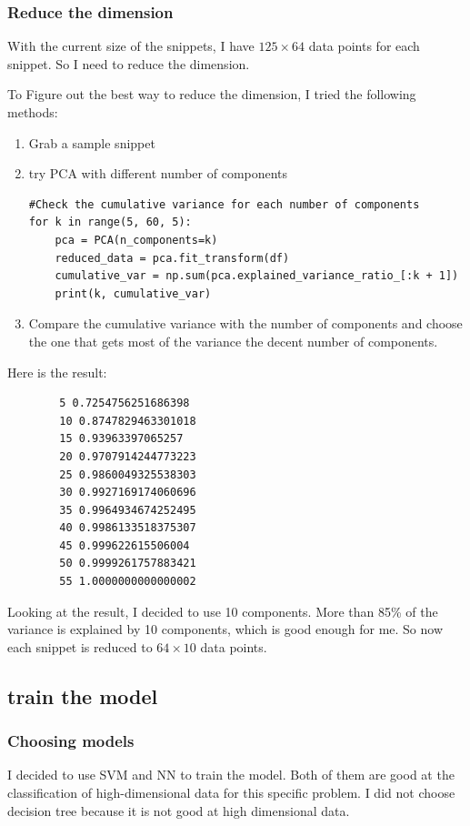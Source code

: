 \documentclass[letterpaper,12pt]{article}
\begin{document}
\subsubsection{Reduce the dimension}
With the current size of the snippets, I have $125\times 64$ data points for each snippet. So I need to reduce the dimension.

To Figure out the best way to reduce the dimension, I tried the following methods:\begin{enumerate}
    \item Grab a sample snippet
    \item try PCA with different number of components\begin{lstlisting}
#Check the cumulative variance for each number of components
for k in range(5, 60, 5):
    pca = PCA(n_components=k)
    reduced_data = pca.fit_transform(df)
    cumulative_var = np.sum(pca.explained_variance_ratio_[:k + 1])
    print(k, cumulative_var)
        \end{lstlisting}
    \item Compare the cumulative variance with the number of components and choose the one that gets most of the variance the decent number of components.
\end{enumerate}
Here is the result: \begin{lstlisting}
        5 0.7254756251686398
        10 0.8747829463301018
        15 0.93963397065257
        20 0.9707914244773223
        25 0.9860049325538303
        30 0.9927169174060696
        35 0.9964934674252495
        40 0.9986133518375307
        45 0.999622615506004
        50 0.9999261757883421
        55 1.0000000000000002
\end{lstlisting}
Looking at the result, I decided to use 10 components. More than 85\% of the variance is explained by 10 components, which is good enough for me. So now each snippet is reduced to $64\times 10$ data points.
\subsection{train the model}
\subsubsection{Choosing models}
I decided to use SVM and NN to train the model. Both of them are good at the classification of high-dimensional data for this specific problem. I did not choose decision tree because it is not good at high dimensional data.
\end{document}

